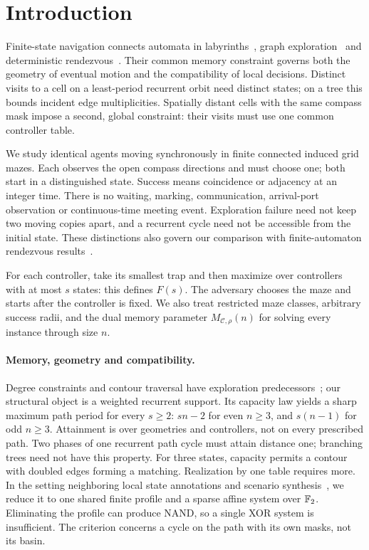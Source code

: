 \section{Introduction}\label{sec:introduction}

Finite-state navigation connects automata in labyrinths~\cite{Budach1978,KilibardaKudryavtsevUscumlic2003},
graph exploration~\cite{FraigniaudEtAl2005,DisserKlimm2022} and deterministic
rendezvous~\cite{Pelc2012Survey,FraigniaudPelc2011,CzyzowiczEtAl2014}.
Their common memory constraint governs both the geometry of eventual motion and
the compatibility of local decisions. Distinct visits to a cell on a least-period
recurrent orbit need distinct states; on a tree this bounds incident edge
multiplicities. Spatially distant cells with the same compass mask impose a second,
global constraint: their visits must use one common controller table.

We study identical agents moving synchronously in finite connected induced grid
mazes. Each observes the open compass directions and must choose one; both start
in a distinguished state. Success means coincidence or adjacency at an integer
time. There is no waiting, marking, communication, arrival-port observation or
continuous-time meeting event. Exploration failure need not keep two moving copies
apart, and a recurrent cycle need not be accessible from the initial state.
These distinctions also govern our comparison with finite-automaton rendezvous
results~\cite{DasPelc2026}.

For each controller, take its smallest trap and then maximize over controllers
with at most $s$ states: this defines $F(s)$. The adversary chooses the maze and
starts after the controller is fixed. We also treat restricted maze classes,
arbitrary success radii, and the dual memory parameter $M_{\mathcal C,\rho}(n)$
for solving every instance through size $n$.

\paragraph{Memory, geometry and compatibility.}
Degree constraints and contour traversal have exploration
predecessors~\cite{DiksEtAl2004,Kilibarda1990}; our structural object is a weighted
recurrent support. Its capacity law yields a sharp maximum path period for every
$s\ge2$: $sn-2$ for even $n\ge3$, and $s(n-1)$ for odd $n\ge3$. Attainment is over
geometries and controllers, not on every prescribed path. Two phases of one
recurrent path cycle must attain distance one; branching trees need not have this
property. For three states, capacity permits a contour with doubled edges forming
a matching. Realization by one table requires more. In the setting neighboring
local state annotations and scenario synthesis~\cite{Martynova2022,UlyantsevBuzhinskyShalyto2016},
we reduce it to one shared finite profile and a sparse affine system over $\mathbb F_2$.
Eliminating the profile can produce NAND, so a single XOR system is insufficient.
The criterion concerns a cycle on the path with its own masks, not its basin.

